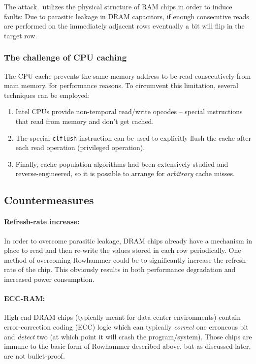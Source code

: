 The attack~\cite{rowhammer} utilizes the physical structure of RAM chips in
order to induce faults: Due to parasitic leakage in DRAM capacitors, if enough
consecutive reads are performed on the immediately adjacent rows eventually a
bit will flip in the target row.

\subsubsection{The challenge of CPU caching}\label{subsubsec:the_challenge_of_cpu_caching}
The CPU cache prevents the same memory address to be read consecutively from
main memory, for performance reasons. To circumvent this limitation, several
techniques can be employed:
\begin{enumerate}
	\item Intel CPUs provide non-temporal read/write opcodes -- special
	instructions that read from memory and don't get cached.
	\item The special \texttt{clflush} instruction can be used to explicitly
	flush the cache after each read operation (privileged operation).
	\item Finally, cache-population algorithms had been extensively studied and
	reverse-engineered, so it is possible to arrange for \emph{arbitrary} cache
	misses.
\end{enumerate}

\subsection{Countermeasures}\label{subsec:countermeasures}
\paragraph{Refresh-rate increase:} In order to overcome parasitic leakage, DRAM
chips already have a mechanism in place to read and then re-write the values
stored in each row periodically. One method of overcoming Rowhammer could be to
significantly increase the refresh-rate of the chip. This obviously results in
both performance degradation and increased power consumption.

\paragraph{ECC-RAM:} High-end DRAM chips (typically meant for data center
environments) contain error-correction coding (ECC) logic which can typically
\emph{correct} one erroneous bit and \emph{detect} two (at which point it will
crash the program/system). Those chips are immune to the basic form of Rowhammer
described above, but as discussed later, are not bullet-proof.


